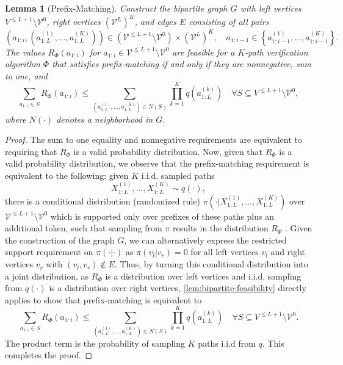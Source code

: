 \documentclass{article}
\theoremstyle{plain}
\newtheorem{lemma}[theorem]{Lemma}
\theoremstyle{definition}
\theoremstyle{remark}
\newcommand{\V}{\mathcal{V}}
\begin{document}
\begin{lemma}[Prefix-Matching]
    Construct the bipartite graph $G$ with left vertices $V^{\leq L+1} \setminus \V^0$, right vertices $(\V^L)^K$, and edges $E$ consisting of all pairs \begin{equation}
        \left(a_{1:i},\left(a^{(1)}_{1:L},\ldots,a^{(K)}_{1:L}\right)\right) \in \left(\V^{\leq L+1}\setminus \V^0\right) \times \left(\V^L\right)^K, \quad a_{1:i-1} \in \left\{a^{(1)}_{1:i-1},\ldots,a^{(K)}_{1:i-1}\right\}.
    \end{equation} The values $R_\Phi(a_{1:i})$ for $a_{1:i} \in \V^{\leq L+1}\setminus \V^0$ are feasible for a $K$-path verification algorithm $\Phi$ that satisfies prefix-matching if and only if they are nonnegative, sum to one, and 
    \begin{equation}
        \sum_{a_{1:i} \in S} R_\Phi(a_{1:i}) \leq \sum_{\left(a^{(1)}_{1:L},\ldots,a^{(K)}_{1:L}\right) \in N(S)}  \prod_{k=1}^K q\left(a^{(k)}_{1:L}\right) \quad \forall S \subseteq V^{\leq L+1} \setminus \V^0,
    \end{equation}
    where $N(\cdot)$ denotes a neighborhood in $G$.
    \label{lem:prefix}
\end{lemma}

\begin{proof}
    The sum to one equality and nonnegative requirements are equivalent to requiring that $R_\Phi$ is a valid probability distribution. Now, given that $R_\Phi$ is a valid probability distribution, we observe that the prefix-matching requirement is equivalent to the following: given $K$ i.i.d. sampled paths 
    \begin{equation}
        X^{(1)}_{1:L},\ldots,X^{(K)}_{1:L} \sim q(\cdot),
    \end{equation}
    there is a conditional distribution (randomized rule) $\pi(\cdot|X^{(1)}_{1:L},\ldots,X^{(K)}_{1:L})$ over $\V^{\leq L+1} \setminus \V^0$ which is supported only over prefixes of these paths plus an additional token, such that sampling from $\pi$ results in the distribution $R_\Phi$ . Given the construction of the graph $G$, we can alternatively express the restricted support requirement on $\pi(\cdot|\cdot)$ as $\pi(v_l|v_r)=0$ for all left vertices $v_l$ and right vertices $v_r$ with $(v_l,v_r) \not \in E$. Thus, by turning this conditional distribution into a joint distribution, as $R_\Phi$ is a distribution over left vertices and i.i.d. sampling from $q(\cdot)$ is a distribution over right vertices, \cref{lem:bipartite-feasibility} directly applies to show that prefix-matching is equivalent to 
    \begin{equation}
        \sum_{a_{1:i} \in S} R_\Phi(a_{1:i}) \leq \sum_{\left(a^{(1)}_{1:L},\ldots,a^{(K)}_{1:L}\right) \in N(S)}  \prod_{k=1}^K q\left(a^{(k)}_{1:L}\right) \quad \forall S \subseteq V^{\leq L+1} \setminus \V^0.
    \end{equation}
    The product term is the probability of sampling $K$ paths i.i.d from $q$. This completes the proof.
\end{proof}
\end{document}
